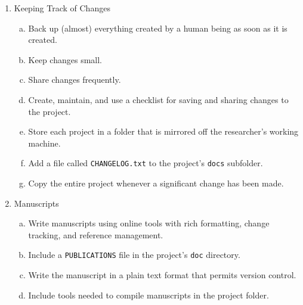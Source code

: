 \documentclass[10pt,letterpaper]{article}
\begin{document}
{\begin{enumerate}
\begin{enumerate}[a)]
  \item Put each project in its own directory, which is named after the project.
  \item Put text documents associated with the project in the \texttt{doc} directory.
  \item Put raw data and metadata in a \texttt{data} directory, and files generated during cleanup and analysis in a \texttt{results} directory.
  \item Put project source code in the \texttt{src} directory.
  \item Put external scripts, or compiled programs in the \texttt{bin} directory.
  \item Name all files to reflect their content or function.
  \end{enumerate}
\item Keeping Track of Changes
  \begin{enumerate}[a)]
  \item Back up (almost) everything created by a human being as soon as it is created.
  \item Keep changes small.
  \item Share changes frequently.
  \item Create, maintain, and use a checklist for saving and sharing changes to the project.
  \item Store each project in a folder that is mirrored off the researcher's working machine.
  \item Add a file called \texttt{CHANGELOG.txt} to the project's \texttt{docs} subfolder.
  \item Copy the entire project whenever a significant change has been made.
  \end{enumerate}
\item Manuscripts
  \begin{enumerate}[a)]
  \item Write manuscripts using online tools with rich formatting, change tracking, and reference management.
  \item Include a \texttt{PUBLICATIONS} file in the project's \texttt{doc} directory.
  \item Write the manuscript in a plain text format that permits version control.
  \item Include tools needed to compile manuscripts in the project folder.
  \end{enumerate}
\end{enumerate}
}

\pagebreak
\end{document}
